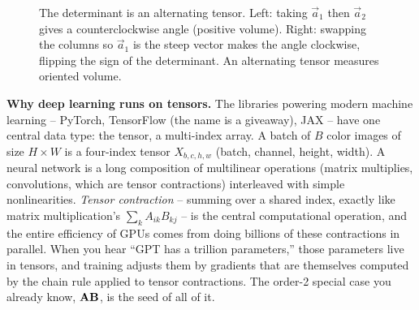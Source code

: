 \begin{figure}[H]
\centering
{}
\caption{The determinant is an alternating tensor. Left: taking $\vec{a}_1$ then $\vec{a}_2$ gives a counterclockwise angle (positive volume). Right: swapping the columns so $\vec{a}_1$ is the steep vector makes the angle clockwise, flipping the sign of the determinant. An alternating tensor measures oriented volume.}
\label{ch37:fig-det-alternating}
\end{figure}

\begin{applicationbox}
\textbf{Why deep learning runs on tensors.} The libraries powering modern machine
learning -- PyTorch, TensorFlow (the name is a giveaway), JAX -- have one central
data type: the tensor, a multi-index array. A batch of $B$ color images of size
$H\times W$ is a four-index tensor $X_{b,c,h,w}$ (batch, channel, height, width).
A neural network is a long composition of multilinear operations (matrix
multiplies, convolutions, which are tensor contractions) interleaved with simple
nonlinearities. \emph{Tensor contraction} -- summing over a shared index, exactly
like matrix multiplication's $\sum_k A_{ik}B_{kj}$ -- is the central computational
operation, and the entire efficiency of GPUs comes from doing billions of these
contractions in parallel. When you hear ``GPT has a trillion parameters,'' those
parameters live in tensors, and training adjusts them by gradients that are
themselves computed by the chain rule applied to tensor contractions. The order-2
special case you already know, $\mathbf{A}\mathbf{B}$, is the seed of all of it.
\end{applicationbox}

